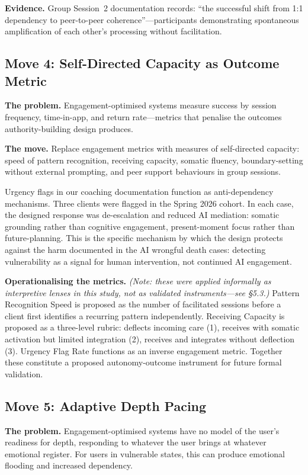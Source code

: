 \documentclass[sigchi,review,anonymous]{acmart}
\begin{document}
\textbf{Evidence.} Group Session~2 documentation records: ``the successful
shift from 1:1 dependency to peer-to-peer coherence''---participants demonstrating spontaneous
amplification of each other's processing without facilitation.

\subsection{Move 4: Self-Directed Capacity as Outcome Metric}

\textbf{The problem.} Engagement-optimised systems measure success by session frequency,
time-in-app, and return rate---metrics that penalise the outcomes authority-building design
produces.

\textbf{The move.} Replace engagement metrics with measures of self-directed capacity:
speed of pattern recognition, receiving capacity, somatic fluency, boundary-setting without
external prompting, and peer support behaviours in group sessions.

Urgency flags in our coaching documentation function as anti-dependency mechanisms. Three
clients were flagged in the Spring 2026 cohort. In each case, the designed response was
de-escalation and reduced AI mediation: somatic grounding rather than cognitive engagement,
present-moment focus rather than future-planning. This is the specific mechanism by which
the design protects against the harm documented in the AI wrongful death cases: detecting
vulnerability as a signal for human intervention, not continued AI engagement.

\textbf{Operationalising the metrics.} \emph{(Note: these were applied informally as
interpretive lenses in this study, not as validated instruments---see §5.3.)}
Pattern Recognition Speed is proposed as the number of facilitated sessions before a client
first identifies a recurring pattern independently. Receiving Capacity is proposed as a
three-level rubric: deflects incoming care (1), receives with somatic activation but limited
integration (2), receives and integrates without deflection (3). Urgency Flag Rate functions
as an inverse engagement metric. Together these constitute a proposed autonomy-outcome
instrument for future formal validation.

\subsection{Move 5: Adaptive Depth Pacing}

\textbf{The problem.} Engagement-optimised systems have no model of the user's readiness for
depth, responding to whatever the user brings at whatever emotional register. For users in
vulnerable states, this can produce emotional flooding and increased dependency.
\end{document}
